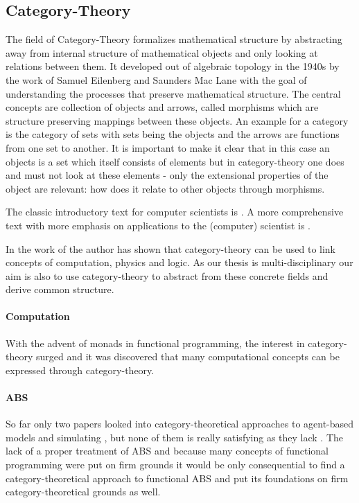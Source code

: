 \subsection{Category-Theory}
The field of Category-Theory formalizes mathematical structure by abstracting away from internal structure of mathematical objects and only looking at relations between them. It developed out of algebraic topology in the 1940s by the work of Samuel Eilenberg and Saunders Mac Lane with the goal of understanding the processes that preserve mathematical structure.
The central concepts are collection of objects and arrows, called morphisms which are structure preserving mappings between these objects. An example for a category is the category of sets with sets being the objects and the arrows are functions from one set to another. It is important to make it clear that in this case an objects is a set which itself consists of elements but in category-theory one does and must not look at these elements - only the extensional properties of the object are relevant: how does it relate to other objects through morphisms.

The classic introductory text for computer scientists is \cite{pierce_basic_1991}. A more comprehensive text with more emphasis on applications to the (computer) scientist is \cite{spivak_category_2014}.

In the work of  \cite{baez_physics_2009} the author has shown that category-theory can be used to link concepts of computation, physics and logic. As our thesis is multi-disciplinary our aim is also to use category-theory to abstract from these concrete fields and derive common structure.

\paragraph{Computation}
With the advent of monads in functional programming, the interest in category-theory surged and it was discovered that many computational concepts can be expressed through category-theory.

\paragraph{ABS}
So far only two papers looked into category-theoretical approaches to agent-based models and simulating \cite{beheshti_analyzing_2013}, \cite{lloyd_category-theoretic_2010} but none of them is really satisfying as they lack . The lack of a proper treatment of ABS and because many concepts of functional programming were put on firm grounds it would be only consequential to find a category-theoretical approach to functional ABS and put its foundations on firm category-theoretical grounds as well.

